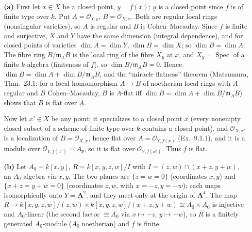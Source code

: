 \documentclass[11pt]{article}
\begin{document}
\pf
\textbf{(a)} First let $x\in X$ be a closed point, $y=f(x)$; $y$ is a closed point since $f$ is of finite type over $k$. Put $A=\mathcal O_{Y,y}$, $B=\mathcal O_{X,x}$. Both are regular local rings (nonsingular varieties), so $A$ is regular and $B$ is Cohen--Macaulay. Since $f$ is finite and surjective, $X$ and $Y$ have the same dimension (integral dependence), and for closed points of varieties $\dim A=\dim Y$, $\dim B=\dim X$; so $\dim B=\dim A$. The fibre ring $B/\mathfrak m_AB$ is the local ring of the fibre $X_y$ at $x$, and $X_y=\operatorname{Spec}$ of a finite $k$-algebra (finiteness of $f$), so $\dim B/\mathfrak m_AB=0$. Hence $\dim B=\dim A+\dim B/\mathfrak m_AB$, and the ``miracle flatness'' theorem (Matsumura, Thm.~23.1: for a local homomorphism $A\to B$ of noetherian local rings with $A$ regular and $B$ Cohen--Macaulay, $B$ is $A$-flat iff $\dim B=\dim A+\dim B/\mathfrak m_AB$) shows that $B$ is flat over $A$.

Now let $x'\in X$ be any point; it specializes to a closed point $x$ (every nonempty closed subset of a scheme of finite type over $k$ contains a closed point), and $\mathcal O_{X,x'}$ is a localization of $B=\mathcal O_{X,x}$, hence flat over $A=\mathcal O_{Y,f(x)}$ (Ex.~9.1.1), and it is a module over $\mathcal O_{Y,f(x')}=A_{\mathfrak p}$, so it is flat over $\mathcal O_{Y,f(x')}$. Thus $f$ is flat.

\textbf{(b)} Let $A_0=k[x,y]$, $R=k[x,y,z,w]/I$ with $I=(z,w)\cap(x+z,y+w)$, an $A_0$-algebra via $x,y$. The two planes are $\{z=w=0\}$ (coordinates $x,y$) and $\{x+z=y+w=0\}$ (coordinates $z,w$, with $x=-z,y=-w$); each maps isomorphically onto $Y=\mathbf A^2$, and they meet only at the origin of $\mathbf A^4$. The map $R\to k[x,y,z,w]/(z,w)\times k[x,y,z,w]/(x+z,y+w)\cong A_0\times A_0$ is injective and $A_0$-linear (the second factor $\cong A_0$ via $x\mapsto-z$, $y\mapsto-w$), so $R$ is a finitely generated $A_0$-module ($A_0$ noetherian) and $f$ is finite.
\end{document}
